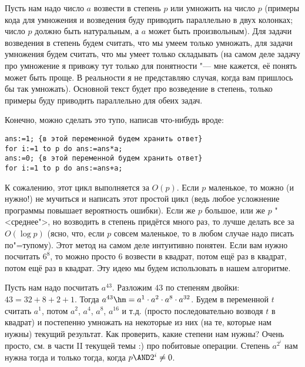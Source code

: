 
Пусть нам надо число $a$ возвести в степень $p$ или умножить на число $p$ (примеры кода для 
умножения и возведения буду приводить параллельно в двух колонках; число $p$ должно быть 
натуральным, а $a$ может быть произвольным). Для задачи возведения в степень будем считать, что мы умеем 
только умножать, для задачи умножения будем считать, что мы умеет только складывать (на самом деле 
задачу про умножение я привожу тут только для понятности "--- мне кажется, её понять может быть проще. В 
реальности я не представляю случая, когда вам пришлось бы так умножать). Основной текст будет про 
возведение в степень, только примеры буду приводить параллельно для обеих задач.

Конечно, можно сделать это тупо, написав что-нибудь вроде:

\begin{codesample}\begin{verbatim}
ans:=1; {в этой переменной будем хранить ответ}
for i:=1 to p do ans:=ans*a;
ans:=0; {в этой переменной будем хранить ответ}
for i:=1 to p do ans:=ans+a;
\end{verbatim}
\end{codesample}

К сожалению, этот цикл выполняется за $O(p)$. Если $p$ маленькое, то можно (и нужно!) не мучиться и написать этот простой цикл 
(ведь любое усложнение программы повышает вероятность ошибки). Если же $p$ большое, или же $p$ 
"<среднее">, но возводить в степень придётся много раз, то лучше делать все за $O(\log p)$ (ясно, что, если $p$ совсем маленькое, то в 
любом случае надо писать по"=тупому). Этот метод на самом деле интуитивно понятен. Если вам нужно посчитать $6^8$, то можно просто $6$ 
возвести в квадрат, потом ещё раз в квадрат, потом ещё раз в квадрат. Эту идею мы будем использовать в нашем алгоритме.

Пусть нам надо посчитать $a^{43}$. Разложим $43$ по степеням двойки: $43 = 32 + 8 + 2 + 1$. Тогда 
$a^{43} \hm= a^1 \cdot a^2 \cdot a^8 \cdot a^{32}$. Будем в переменной $t$ считать $a^1$, потом $a^2$, 
$a^4$, $a^8$, $a^{16}$ и т.д. (просто последовательно возводя $t$ в квадрат) и постепенно 
умножать на некоторые из них (на те, которые нам нужны) текущий результат. Как проверить, 
какие степени нам нужны? Очень просто, см. в части II текущей темы :) про побитовые операции. 
Степень $a^{2^i}$ нам нужна тогда и только тогда, когда $p \AND 2^i \neq 0$.

